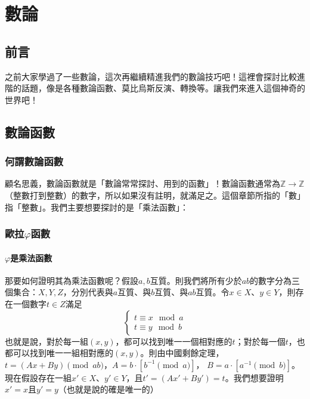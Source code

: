 \documentclass[main.tex]{subfiles}
\begin{document}
\chapter{數論 \uppercase\expandafter{}}
\section*{前言}
	之前大家學過了一些數論，這次再繼續精進我們的數論技巧吧！這裡會探討比較進階的話題，像是各種數論函數、莫比烏斯反演、轉換等。讓我們來進入這個神奇的世界吧！
\section*{數論函數}
	\subsection*{何謂數論函數}
	顧名思義，數論函數就是「數論常常探討、用到的函數」！數論函數通常為$\mathbb{Z} \rightarrow \mathbb{Z}$（整數打到整數）的數字，所以如果沒有註明，就滿足之。這個章節所指的「數」指「整數」。我們主要想要探討的是「乘法函數」：
	\subsection*{歐拉$\varphi$函數}
		\subsubsection{$\varphi$是乘法函數}
		那要如何證明其為乘法函數呢？假設$a, b$互質。則我們將所有少於$ab$的數字分為三個集合：$X, Y, Z$，分別代表與$a$互質、與$b$互質、與$ab$互質。令$x \in X$、$y \in Y$，則存在一個數字$t \in Z$滿足
		$$\begin{cases}
		t\equiv x \mod a\\
		t\equiv y \mod b
		\end{cases}$$
		也就是說，對於每一組$(x, y)$，都可以找到唯一一個相對應的$t$；對於每一個$t$，也都可以找到唯一一組相對應的$(x, y)$。則由中國剩餘定理，$t = (Ax + By) \pmod{ab}$，$A = b \cdot \left[b^{-1} \pmod a\right]$， $B = a \cdot \left[a^{-1} \pmod b\right]$。現在假設存在一組$x' \in X$、$y' \in Y$，且$t' = (Ax' + By') = t$。我們想要證明$x' = x$且$y' = y$（也就是說的確是唯一的）
		
\end{document}
